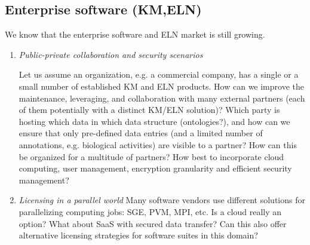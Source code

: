 \documentclass{sig-alternate}
\begin{document}
\subsection*{Enterprise software (KM,ELN)}
We know that the enterprise software and ELN market is still growing.
\begin{enumerate}
\item \emph{Public-private collaboration and security scenarios}

  Let us assume an organization, e.g. a commercial company, has a
  single or a small number of established KM and ELN products.  How
  can we improve the maintenance, leveraging, and collaboration with
  many external partners (each of them potentially with a distinct KM/ELN
  solution)? Which party is hosting which data in which data structure
  (ontologies?), and how can we ensure that only pre-defined data
  entries (and a limited number of annotations, e.g. biological
  activities) are visible to a partner?  How can this be organized for
  a multitude of partners?  How best to incorporate cloud computing, user management,
  encryption granularity and efficient security management?

\item \emph{Licensing in a parallel world} Many software vendors use
  different solutions for parallelizing computing jobs: SGE, PVM, MPI,
  etc.  Is a cloud really an option?  What about SaaS with secured data
  transfer?  Can this also offer alternative licensing strategies for
  software suites in this domain?


\end{enumerate}
%


\end{document}
